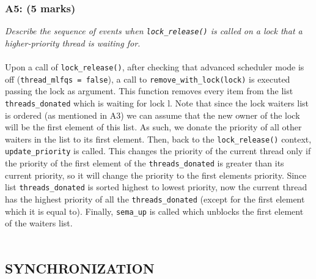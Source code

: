 \documentclass{article}
\begin{document}
\subsubsection*{A5: (5 marks) }
\textit{Describe the sequence of events when \texttt{lock\_release()} is called on a lock that a higher-priority thread is waiting for.}
\\ \\
Upon a call of \texttt{lock\_release()}, after checking that advanced scheduler mode is off (\texttt{thread\_mlfqs = false}), a call to \texttt{remove\_with\_lock(lock)} is executed passing the lock as argument. This function removes every item from the list \texttt{threads\_donated} which is waiting for lock l.
Note that since the lock waiters list is ordered (as mentioned in A3) we can assume that the new owner of the lock will be the first element of this list. As such, we donate the priority of all other waiters in the list to its first element.
Then, back to the \texttt{lock\_release()} context, \texttt{update\_priority} is called. This changes the priority of the current thread only if the priority of the first element of the \texttt{threads\_donated} is greater than its current priority, so it will change the priority to the first elements priority. Since list \texttt{threads\_donated} is sorted highest to lowest priority, now the current thread has the highest priority of all the \texttt{threads\_donated} (except for the first element which it is equal to).
Finally, \texttt{sema\_up} is called which unblocks the first element of the waiters list.
\\ \\


\subsection{SYNCHRONIZATION}
\end{document}
